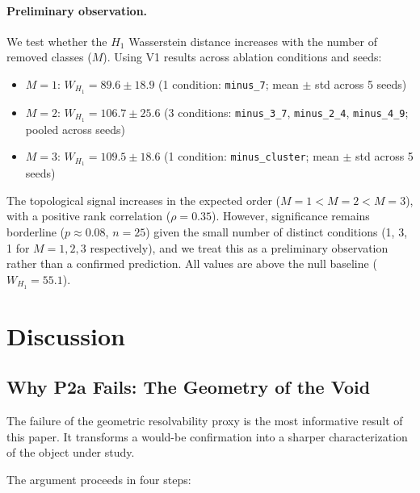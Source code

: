 \documentclass[11pt]{article}
\begin{document}
\paragraph{Preliminary observation.}
We test whether the $H_1$ Wasserstein distance increases with the number
of removed classes ($M$).
Using V1 results across ablation conditions and seeds:
\begin{itemize}
\item $M = 1$: $W_{H_1} = 89.6 \pm 18.9$
  (1 condition: \texttt{minus\_7}; mean $\pm$ std across 5 seeds)
\item $M = 2$: $W_{H_1} = 106.7 \pm 25.6$
  (3 conditions: \texttt{minus\_3\_7}, \texttt{minus\_2\_4},
  \texttt{minus\_4\_9}; pooled across seeds)
\item $M = 3$: $W_{H_1} = 109.5 \pm 18.6$
  (1 condition: \texttt{minus\_cluster}; mean $\pm$ std across 5 seeds)
\end{itemize}

The topological signal increases in the expected order ($M{=}1 < M{=}2 < M{=}3$),
with a positive rank correlation ($\rho = 0.35$).
However, significance remains borderline ($p \approx 0.08$, $n = 25$)
given the small number of distinct conditions (1, 3, 1 for $M = 1, 2, 3$
respectively), and we treat this as a preliminary observation rather than
a confirmed prediction.
All values are above the null baseline ($W_{H_1} = 55.1$).


\section{Discussion}
\label{sec:discussion}

\subsection{Why P2a Fails: The Geometry of the Void}
\label{sec:why_p2a}

The failure of the geometric resolvability proxy is the most informative
result of this paper.
It transforms a would-be confirmation into a sharper characterization of
the object under study.

The argument proceeds in four steps:
\end{document}
